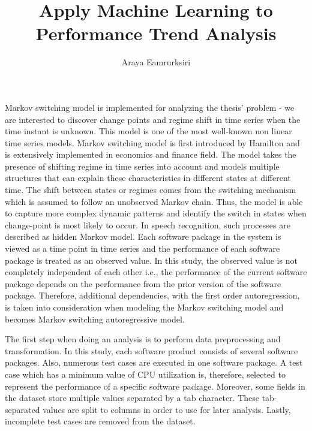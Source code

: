 \documentclass[]{article}
\title{Apply Machine Learning to Performance Trend Analysis}
\author{Araya Eamrurksiri}
\begin{document}
\date{}
\maketitle

Markov switching model is implemented for analyzing the thesis' problem - we are interested to discover change points and regime shift in time series when the time instant is unknown. This model is one of the most well-known non linear time series models. Markov switching model is first introduced by Hamilton \cite{hamilton1989new} and is extensively implemented in economics and finance field. The model takes the presence of shifting regime in time series into account and models multiple structures that can explain these characteristics in different states at different time. The shift between states or regimes comes from the switching mechanism which is assumed to follow an unobserved Markov chain. Thus, the model is able to capture more complex dynamic patterns and identify the switch in states when change-point is most likely to occur. In speech recognition, such processes are described as hidden Markov model. Each software package in the system is viewed as a time point in time series and the performance of each software package is treated as an observed value. In this study, the observed value is not completely independent of each other i.e., the performance of the current software package depends on the performance from the prior version of the software package. Therefore, additional dependencies, with the first order autoregression, is taken into consideration when modeling the Markov switching model and becomes Markov switching autoregressive model.

The first step when doing an analysis is to perform data preprocessing and transformation. In this study, each software product consists of several software packages. Also, numerous test cases are executed in one software package. A test case which has a minimum value of CPU utilization is, therefore, selected to represent the performance of a specific software package. Moreover, some fields in the dataset store multiple values separated by a tab character. These tab-separated values are split to columns in order to use for later analysis. Lastly, incomplete test cases are removed from the dataset.
\end{document}
